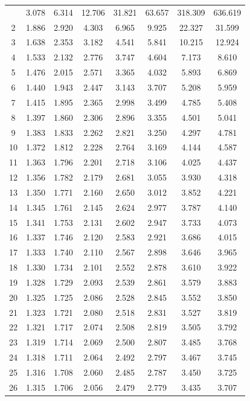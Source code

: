 \documentclass[12pt,a4paper]{article}
\begin{document}
\begin{enumerate}
\begin{center}
\begin{longtable}{c | ccccccc}
\bottomrule
\endlastfoot
1 & 3.078 & 6.314 & 12.706 & 31.821 & 63.657 & 318.309 & 636.619 \\
2 & 1.886 & 2.920 & 4.303 & 6.965 & 9.925 & 22.327 & 31.599 \\
3 & 1.638 & 2.353 & 3.182 & 4.541 & 5.841 & 10.215 & 12.924 \\
4 & 1.533 & 2.132 & 2.776 & 3.747 & 4.604 & 7.173 & 8.610 \\
5 & 1.476 & 2.015 & 2.571 & 3.365 & 4.032 & 5.893 & 6.869 \\
6 & 1.440 & 1.943 & 2.447 & 3.143 & 3.707 & 5.208 & 5.959 \\
7 & 1.415 & 1.895 & 2.365 & 2.998 & 3.499 & 4.785 & 5.408 \\
8 & 1.397 & 1.860 & 2.306 & 2.896 & 3.355 & 4.501 & 5.041 \\
9 & 1.383 & 1.833 & 2.262 & 2.821 & 3.250 & 4.297 & 4.781 \\
10 & 1.372 & 1.812 & 2.228 & 2.764 & 3.169 & 4.144 & 4.587 \\
11 & 1.363 & 1.796 & 2.201 & 2.718 & 3.106 & 4.025 & 4.437 \\
12 & 1.356 & 1.782 & 2.179 & 2.681 & 3.055 & 3.930 & 4.318 \\
13 & 1.350 & 1.771 & 2.160 & 2.650 & 3.012 & 3.852 & 4.221 \\
14 & 1.345 & 1.761 & 2.145 & 2.624 & 2.977 & 3.787 & 4.140 \\
15 & 1.341 & 1.753 & 2.131 & 2.602 & 2.947 & 3.733 & 4.073 \\
16 & 1.337 & 1.746 & 2.120 & 2.583 & 2.921 & 3.686 & 4.015 \\
17 & 1.333 & 1.740 & 2.110 & 2.567 & 2.898 & 3.646 & 3.965 \\
18 & 1.330 & 1.734 & 2.101 & 2.552 & 2.878 & 3.610 & 3.922 \\
19 & 1.328 & 1.729 & 2.093 & 2.539 & 2.861 & 3.579 & 3.883 \\
20 & 1.325 & 1.725 & 2.086 & 2.528 & 2.845 & 3.552 & 3.850 \\
21 & 1.323 & 1.721 & 2.080 & 2.518 & 2.831 & 3.527 & 3.819 \\
22 & 1.321 & 1.717 & 2.074 & 2.508 & 2.819 & 3.505 & 3.792 \\
23 & 1.319 & 1.714 & 2.069 & 2.500 & 2.807 & 3.485 & 3.768 \\
24 & 1.318 & 1.711 & 2.064 & 2.492 & 2.797 & 3.467 & 3.745 \\
25 & 1.316 & 1.708 & 2.060 & 2.485 & 2.787 & 3.450 & 3.725 \\
26 & 1.315 & 1.706 & 2.056 & 2.479 & 2.779 & 3.435 & 3.707 \\

\end{longtable}
\end{center}
\end{enumerate}
\end{document}
